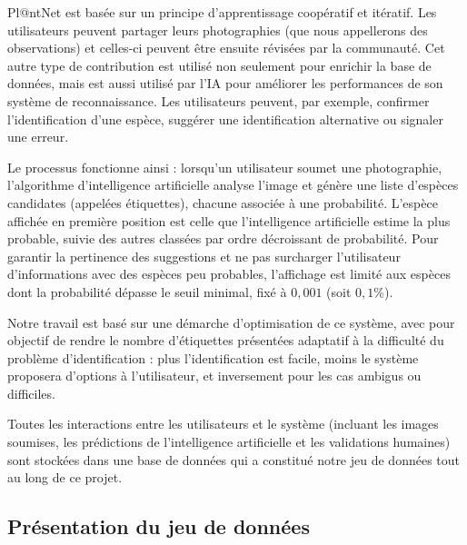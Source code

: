 \documentclass[a4paper,12pt]{article}
\begin{document}
Pl@ntNet est basée sur un principe d’apprentissage coopératif et itératif. Les utilisateurs peuvent partager leurs photographies (que nous appellerons des observations) et celles-ci peuvent être ensuite révisées par la communauté. Cet autre type de contribution est utilisé non seulement pour enrichir la base de données, mais est aussi utilisé par l’IA pour améliorer les performances de son système de reconnaissance. Les utilisateurs peuvent, par exemple, confirmer l'identification d'une espèce, suggérer une identification alternative ou signaler une erreur.

\vspace{0.2cm}

Le processus fonctionne ainsi : lorsqu'un utilisateur soumet une photographie, l'algorithme d'intelligence artificielle analyse l'image et génère une liste d'espèces candidates (appelées étiquettes), chacune associée à une probabilité. L'espèce affichée en première position est celle que l'intelligence artificielle estime la plus probable, suivie des autres classées par ordre décroissant de probabilité. Pour garantir la pertinence des suggestions et ne pas surcharger l'utilisateur d'informations avec des espèces peu probables, l'affichage est limité aux espèces dont la probabilité dépasse le seuil minimal, fixé à $0,001$ (soit $0,1\%$).

\vspace{0.2cm}

Notre travail est basé sur une démarche d'optimisation de ce système, avec pour objectif de rendre le nombre d'étiquettes présentées adaptatif à la difficulté du problème d'identification : plus l'identification est facile, moins le système proposera d'options à l'utilisateur, et inversement pour les cas ambigus ou difficiles.

\vspace{0.2cm}

Toutes les interactions entre les utilisateurs et le système (incluant les images soumises, les prédictions de l'intelligence artificielle et les validations humaines) sont stockées dans une base de données qui a constitué notre jeu de données tout au long de ce projet.


\subsection{Présentation du jeu de données}
\end{document}
